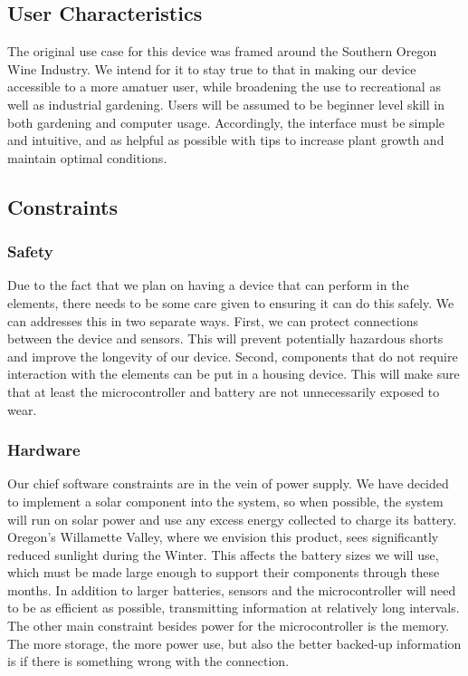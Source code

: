 \documentclass[IEEEtran,letterpaper,10pt,titlepage,fleqn,draftclsnofoot,onecolumn]{article}
\begin{document}
\subsection{User Characteristics}

The original use case for this device was framed around the Southern Oregon Wine Industry. We intend for it to stay true to that in making our device accessible to a more amatuer user, while broadening the use to recreational as well as industrial gardening. Users will be assumed to be beginner level skill in both gardening and computer usage. Accordingly, the interface must be simple and intuitive, and as helpful as possible with tips to increase plant growth and maintain optimal conditions.   

\subsection{Constraints}
\subsubsection{Safety}

Due to the fact that we plan on having a device that can perform in the elements, there needs to be some care given to ensuring it can do this safely. We can addresses this in two separate ways. First, we can protect connections between the device and sensors. This will prevent potentially hazardous shorts and improve the longevity of our device. Second, components that do not require interaction with the elements can be put in a housing device. This will make sure that at least the microcontroller and battery are not unnecessarily exposed to wear. 

\subsubsection{Hardware}

Our chief software constraints are in the vein of power supply. We have decided to implement a solar component into the system, so when possible, the system will run on solar power and use any excess energy collected to charge its battery. Oregon’s Willamette Valley, where we envision this product, sees significantly reduced sunlight during the Winter. This affects the battery sizes we will use, which must be made large enough to support their components through these months. In addition to larger batteries, sensors and the microcontroller will need to be as efficient as possible, transmitting information at relatively long intervals. The other main constraint besides power for the microcontroller is the memory. The more storage, the more power use, but also the better backed-up information is if there is something wrong with the connection.   
\end{document}

